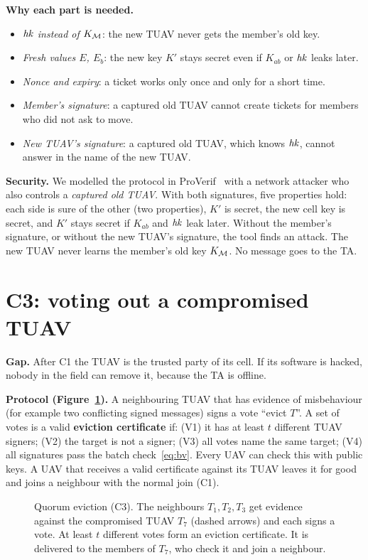 \documentclass[11pt,openany]{report}
\begin{document}
\textbf{Why each part is needed.}
\begin{itemize}[leftmargin=*]
\item \emph{$\mathit{hk}$ instead of $K_{\mathcal{M}}$}: the new TUAV never gets the member's old key.
\item \emph{Fresh values $E$, $E_b$}: the new key $K'$ stays secret even if $K_{ab}$ or $\mathit{hk}$ leaks later.
\item \emph{Nonce and expiry}: a ticket works only once and only for a short time.
\item \emph{Member's signature}: a captured old TUAV cannot create tickets for members who did not ask to move.
\item \emph{New TUAV's signature}: a captured old TUAV, which knows $\mathit{hk}$, cannot answer in the name of the new TUAV.
\end{itemize}

\textbf{Security.} We modelled the protocol in ProVerif~\cite{blanchet16} with a network attacker who also controls a \emph{captured old TUAV}. With both
signatures, five properties hold: each side is sure of the other (two properties), $K'$ is secret, the new cell key is secret, and $K'$ stays secret if
$K_{ab}$ and $\mathit{hk}$ leak later. Without the member's signature, or without the new TUAV's signature, the tool finds an attack. The new TUAV never
learns the member's old key $K_{\mathcal{M}}$. No message goes to the TA.

\section{C3: voting out a compromised TUAV}\label{sec:c3}
\textbf{Gap.} After C1 the TUAV is the trusted party of its cell. If its software is hacked, nobody in the field can remove it, because the TA is
offline.

\textbf{Protocol (Figure~\ref{fig:c3vote}).} A neighbouring TUAV that has evidence of misbehaviour (for example two conflicting signed messages) signs a
vote ``evict $T$''. A set of votes is a valid \textbf{eviction certificate} if: (V1) it has at least $t$ different TUAV signers; (V2) the target is not
a signer; (V3) all votes name the same target; (V4) all signatures pass the batch check~\eqref{eq:bv}. Every UAV can check this with public keys. A UAV
that receives a valid certificate against its TUAV leaves it for good and joins a neighbour with the normal join (C1).

\begin{figure}[H]
\centering

\caption{Quorum eviction (C3). The neighbours $T_1,T_2,T_3$ get evidence against the compromised TUAV $T_7$ (dashed arrows) and each signs a vote. At
least $t$ different votes form an eviction certificate. It is delivered to the members of $T_7$, who check it and join a neighbour.}
\label{fig:c3vote}
\end{figure}
\end{document}
